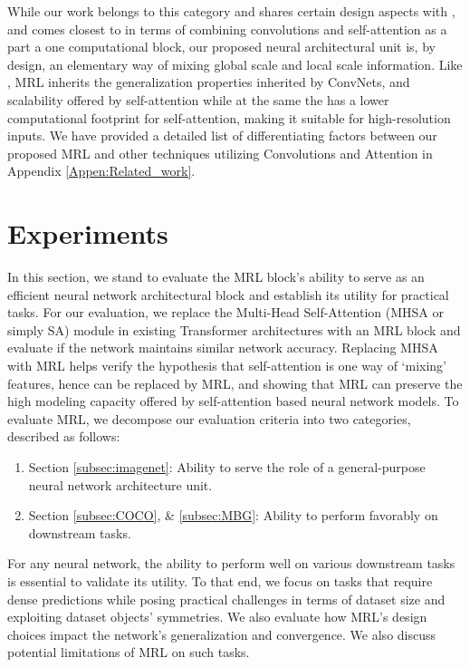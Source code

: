 \documentclass{article}
\begin{document}
\BlankLine
While our work belongs to this category and shares certain design aspects with \cite{DBLP:journals/corr/Twins, chen2022regionvit}, and comes closest to \cite{DBLP:journals/corr/CoAtNet, muse} in terms of combining convolutions and self-attention as a part a one computational block, our proposed neural architectural unit is, by design, an elementary way of mixing global scale and local scale information. Like \cite{DBLP:journals/corr/CoAtNet}, MRL inherits the generalization properties inherited by ConvNets, and scalability offered by self-attention while at the same the has a lower computational footprint for self-attention, making it suitable for high-resolution inputs. We have provided a detailed list of differentiating factors between our proposed MRL and other techniques utilizing Convolutions and Attention in Appendix \ref{Appen:Related_work}.

\section{Experiments}

In this section, we stand to evaluate the MRL block's ability to serve as an efficient neural network architectural block and establish its utility for practical tasks. For our evaluation, we replace the Multi-Head Self-Attention (MHSA or simply SA) module in existing Transformer architectures with an MRL block and evaluate if the network maintains similar network accuracy. Replacing MHSA with MRL helps verify the hypothesis that self-attention is one way of `mixing' features, hence can be replaced by MRL, and showing that MRL can preserve the high modeling capacity offered by self-attention based neural network models. To evaluate MRL, we decompose our evaluation criteria into two categories, described as follows:

\begin{enumerate}
    \item Section \ref{subsec:imagenet}: Ability to serve the role of a general-purpose neural network architecture unit.
    \item Section \ref{subsec:COCO}, \& \ref{subsec:MBG}: Ability to perform favorably on downstream tasks.
\end{enumerate}
For any neural network, the ability to perform well on various downstream tasks is essential to validate its utility. To that end, we focus on tasks that require dense predictions while posing practical challenges in terms of dataset size and exploiting dataset objects' symmetries. We also evaluate how MRL's design choices impact the network's generalization and convergence. We also discuss potential limitations of MRL on such tasks.
\end{document}
